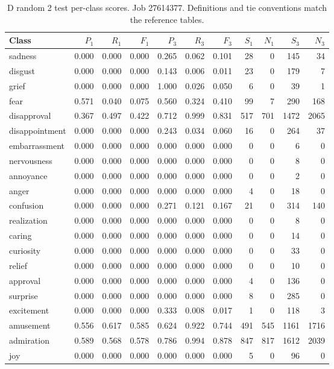 \begin{table}[!htbp]
\centering
\scriptsize
\setlength{\tabcolsep}{5pt}
\begin{tabular}{lrrrrrrrrrr}
\toprule
Class & $P_1$ & $R_1$ & $F_1$ & $P_3$ & $R_3$ & $F_3$ & $S_1$ & $N_1$ & $S_3$ & $N_3$ \\
\midrule
sadness & 0.000 & 0.000 & 0.000 & 0.265 & 0.062 & 0.101 & 28 & 0 & 145 & 34 \\
disgust & 0.000 & 0.000 & 0.000 & 0.143 & 0.006 & 0.011 & 23 & 0 & 179 & 7 \\
grief & 0.000 & 0.000 & 0.000 & 1.000 & 0.026 & 0.050 & 6 & 0 & 39 & 1 \\
fear & 0.571 & 0.040 & 0.075 & 0.560 & 0.324 & 0.410 & 99 & 7 & 290 & 168 \\
disapproval & 0.367 & 0.497 & 0.422 & 0.712 & 0.999 & 0.831 & 517 & 701 & 1472 & 2065 \\
disappointment & 0.000 & 0.000 & 0.000 & 0.243 & 0.034 & 0.060 & 16 & 0 & 264 & 37 \\
embarrassment & 0.000 & 0.000 & 0.000 & 0.000 & 0.000 & 0.000 & 0 & 0 & 6 & 0 \\
nervousness & 0.000 & 0.000 & 0.000 & 0.000 & 0.000 & 0.000 & 0 & 0 & 8 & 0 \\
annoyance & 0.000 & 0.000 & 0.000 & 0.000 & 0.000 & 0.000 & 0 & 0 & 2 & 0 \\
anger & 0.000 & 0.000 & 0.000 & 0.000 & 0.000 & 0.000 & 4 & 0 & 18 & 0 \\
confusion & 0.000 & 0.000 & 0.000 & 0.271 & 0.121 & 0.167 & 21 & 0 & 314 & 140 \\
realization & 0.000 & 0.000 & 0.000 & 0.000 & 0.000 & 0.000 & 0 & 0 & 8 & 0 \\
caring & 0.000 & 0.000 & 0.000 & 0.000 & 0.000 & 0.000 & 0 & 0 & 14 & 0 \\
curiosity & 0.000 & 0.000 & 0.000 & 0.000 & 0.000 & 0.000 & 0 & 0 & 33 & 0 \\
relief & 0.000 & 0.000 & 0.000 & 0.000 & 0.000 & 0.000 & 0 & 0 & 10 & 0 \\
approval & 0.000 & 0.000 & 0.000 & 0.000 & 0.000 & 0.000 & 4 & 0 & 136 & 0 \\
surprise & 0.000 & 0.000 & 0.000 & 0.000 & 0.000 & 0.000 & 8 & 0 & 285 & 0 \\
excitement & 0.000 & 0.000 & 0.000 & 0.333 & 0.008 & 0.017 & 1 & 0 & 118 & 3 \\
amusement & 0.556 & 0.617 & 0.585 & 0.624 & 0.922 & 0.744 & 491 & 545 & 1161 & 1716 \\
admiration & 0.589 & 0.568 & 0.578 & 0.786 & 0.994 & 0.878 & 847 & 817 & 1612 & 2039 \\
joy & 0.000 & 0.000 & 0.000 & 0.000 & 0.000 & 0.000 & 5 & 0 & 96 & 0 \\
\bottomrule
\end{tabular}
\caption{D random 2 test per-class scores. Job 27614377. Definitions and tie conventions match the reference tables.}
\label{tab:classes-d_random_k2}
\end{table}
